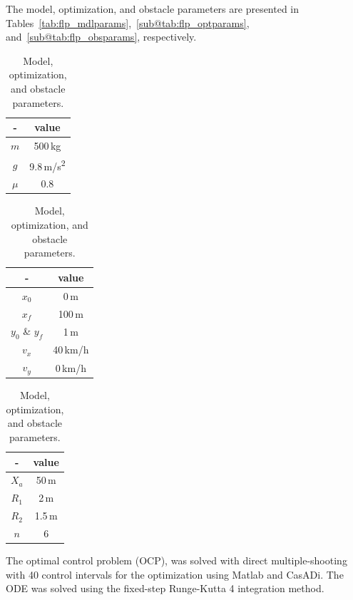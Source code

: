 The model, optimization, and obstacle parameters are presented in Tables~\ref{tab:flp_mdlparams},~\ref{sub@tab:flp_optparams}, and~\ref{sub@tab:flp_obsparams}, respectively. 

\begin{table}[h!]
    \begin{subtable}[h]{0.3\textwidth}
        \centering
        \begin{tabular}{c|c}
            - & value \\
            \hline
            $m$ & 500\,kg\\
            $g$ & 9.8\,m/s\textsuperscript{2}\\
            $\mu$ & 0.8\\
        \end{tabular}
        \caption{Model parameters}
        \label{tab:flp_mdlparams}
    \end{subtable}
    \hfill
    \begin{subtable}[h]{0.3\textwidth}
        \centering
        \begin{tabular}{c|c}
            - & value \\
            \hline
            $x_0$ & 0\,m\\
            $x_f$ & 100\,m\\
            $y_0$ \& $y_f$ & 1\,m\\
            $v_x$ & 40\,km/h\\
            $v_y$ & 0\,km/h
        \end{tabular}
        \caption{Initial parameters}
        \label{tab:flp_optparams}
    \end{subtable}
    \hfill
    \begin{subtable}[h]{0.3\textwidth}
        \centering
        \begin{tabular}{c|c}
            - & value \\
            \hline
            $X_a$ & 50\,m\\
            $R_1$ & 2\,m\\
            $R_2$ & 1.5\,m\\
            $n$ & 6\\
        \end{tabular}
        \caption{Obstacle parameters}
        \label{tab:flp_obsparams}
    \end{subtable}
    \caption{Model, optimization, and obstacle parameters.}
    \label{tab:temps}
\end{table}

The optimal control problem (OCP), was solved with direct multiple-shooting with 40 control intervals for the optimization using Matlab and CasADi. The ODE was solved using the fixed-step Runge-Kutta 4 integration method. 

